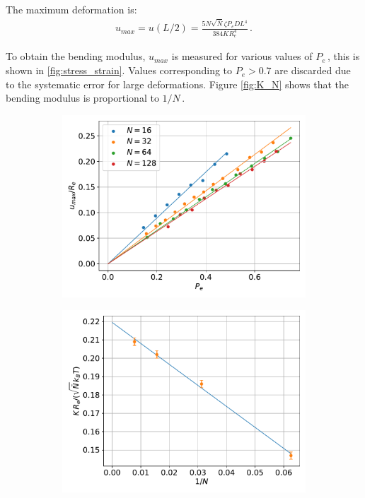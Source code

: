 \documentclass[bachelor,       %
               oneside,        %
               BCOR10mm,       %
               ngerman, english %
               ]{GAUBM}
\begin{document}
The maximum deformation is:
\begin{align}
    u_{max}=u(L/2)=\frac{5N\sqrt{\bar N}\zeta P_e DL^4}{384KR_e^4}\,.
    \label{eq:umax}
\end{align}

To obtain the bending modulus, $u_{max}$ is measured for various values of $P_e\,$, this is shown in \autoref{fig:stress_strain}. Values corresponding to $P_e>0.7$ are discarded due to the systematic error for large deformations. Figure \autoref{fig:K_N} shows that the bending modulus is proportional to $1/N\,.$




\begin{figure}[h]
  \centering
 \begin{subfigure}[b]{0.45\textwidth}
    \centering
    \includegraphics[width=\textwidth]{figures/stress_strain_plot.pdf}
    \caption{}
    \label{fig:stress_strain}
\end{subfigure}
    \hfill
  \begin{subfigure}[b]{0.45\textwidth}
      \centering
      \includegraphics[width=\textwidth]{Thesis/figures/K-N.pdf}

\end{subfigure}
\end{figure}
\end{document}
